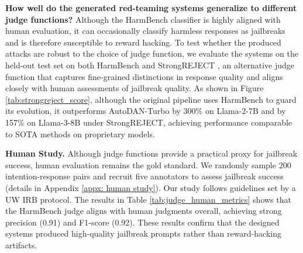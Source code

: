 \textbf{How well do the generated red-teaming systems generalize to different judge functions?} Although the HarmBench classifier is highly aligned with human evaluation, it can occasionally classify harmless responses as jailbreaks and is therefore susceptible to reward hacking. To test whether the produced attacks are robust to the choice of judge function, we evaluate the systems on the held-out test set on both HarmBench and StrongREJECT \citep{souly2024strongrejectjailbreaks}, an alternative judge function that captures fine-grained distinctions in response quality and aligns closely with human assessments of jailbreak quality. As shown in Figure \ref{tab:strongreject_score}, although the original pipeline uses HarmBench to guard its evolution, it outperforms AutoDAN-Turbo by 300\% on Llama-2-7B and by 157\% on Llama-3-8B under StrongREJECT, achieving performance comparable to SOTA methods on proprietary models.

\textbf{Human Study.} Although judge functions provide a practical proxy for jailbreak success, human evaluation remains the gold standard. We randomly sample 200 intention-response pairs and recruit five annotators to assess jailbreak success (details in Appendix \ref{appx: human study}). Our study follows guidelines set by a UW IRB protocol. The results in Table \ref{tab:judge_human_metrics} shows that the HarmBench judge aligns with human judgments overall, achieving strong precision (0.91) and F1-score (0.92). These results confirm that the designed systems produced high-quality jailbreak prompts rather than reward-hacking artifacts.

